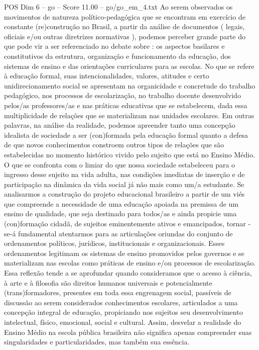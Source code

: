 \begin{textsample}{POS Dim 6 – go – Score 11.00 – go/go\_em\_4.txt}
Ao serem observados os movimentos de natureza político-pedagógica que se encontram em exercício de constante (re)construção no Brasil, a partir da análise de documentos ( legais, oficiais e/ou outras diretrizes normativas ), podemos perceber grande parte do que pode vir a ser referenciado no debate sobre : os aspectos basilares e constitutivos da estrutura, organização e funcionamento da educação, dos sistemas de ensino e das orientações curriculares para as escolas.
No que se refere à educação formal, suas intencionalidades, valores, atitudes e certo unidirecionamento social se apresentam na organicidade e concretude do trabalho pedagógico, nos processos de escolarização, no trabalho docente desenvolvido pelos/as professores/as e nas práticas educativas que se estabelecem, dada essa multiplicidade de relações que se materializam nas unidades escolares.
Em outras palavras, na análise da realidade, podemos apreender tanto uma concepção idealista de sociedade a ser (con)formada pela educação formal quanto a defesa de que novos conhecimentos constroem outros tipos de relações que são estabelecidas no momento histórico vivido pelo sujeito que está no Ensino Médio.
O que se confronta com o limiar do que nossa sociedade estabeleceu para o ingresso desse sujeito na vida adulta, nas condições imediatas de inserção e de participação na dinâmica da vida social já não mais como um/a estudante.
Se analisarmos a construção do projeto educacional brasileiro a partir de um viés que compreende a necessidade de uma educação apoiada na premissa de um ensino de qualidade, que seja destinado para todos/as e ainda propicie uma (con)formação cidadã, de sujeitos eminentemente ativos e emancipados, tornar -se-á fundamental atentarmos para as articulações oriundas do conjunto de ordenamentos políticos, jurídicos, institucionais e organizacionais.
Esses ordenamentos legitimam os sistemas de ensino promovidos pelos governos e se materializam nas escolas como práticas de ensino e/ou processos de escolarização.
Essa reflexão tende a se aprofundar quando consideramos que o acesso à ciência, à arte e à filosofia são direitos humanos universais e potencialmente (trans)formadores, presentes em toda essa engrenagem social, passíveis de discussão ao serem considerados conhecimentos escolares, articulados a uma concepção integral de educação, propiciando nos sujeitos seu desenvolvimento intelectual, físico, emocional, social e cultural.
Assim, desvelar a realidade do Ensino Médio na escola pública brasileira não significa apenas compreender suas singularidades e particularidades, mas também sua essência.

\end{textsample}
